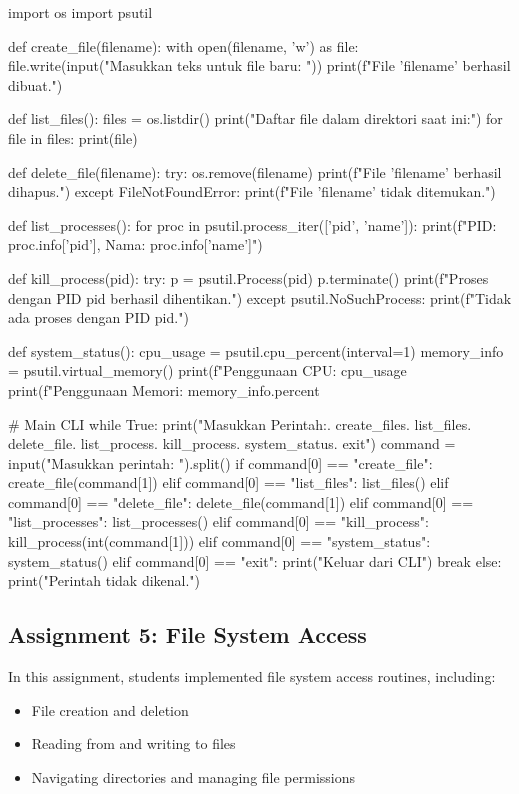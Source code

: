 \documentclass[12pt]{article}
\begin{document}
\begin{python}
import os
import psutil

def create_file(filename):
    with open(filename, 'w') as file:
        file.write(input("Masukkan teks untuk file baru: "))
    print(f"File '{filename}' berhasil dibuat.")

def list_files():
    files = os.listdir()
    print("Daftar file dalam direktori saat ini:")
    for file in files:
        print(file)

def delete_file(filename):
    try:
        os.remove(filename)
        print(f"File '{filename}' berhasil dihapus.")
    except FileNotFoundError:
        print(f"File '{filename}' tidak ditemukan.")

def list_processes():
    for proc in psutil.process_iter(['pid', 'name']):
        print(f"PID: {proc.info['pid']}, Nama: {proc.info['name']}")

def kill_process(pid):
    try:
        p = psutil.Process(pid)
        p.terminate()
        print(f"Proses dengan PID {pid} berhasil dihentikan.")
    except psutil.NoSuchProcess:
        print(f"Tidak ada proses dengan PID {pid}.")

def system_status():
    cpu_usage = psutil.cpu_percent(interval=1)
    memory_info = psutil.virtual_memory()
    print(f"Penggunaan CPU: {cpu_usage}%
    print(f"Penggunaan Memori: {memory_info.percent}%

# Main CLI
while True:
    print("Masukkan Perintah:. create_files. list_files. delete_file. list_process. kill_process. system_status. exit\n")
    command = input("Masukkan perintah: ").split()
    if command[0] == "create_file":
        create_file(command[1])
    elif command[0] == "list_files":
        list_files()
    elif command[0] == "delete_file":
        delete_file(command[1])
    elif command[0] == "list_processes":
        list_processes()
    elif command[0] == "kill_process":
        kill_process(int(command[1]))
    elif command[0] == "system_status":
        system_status()
    elif command[0] == "exit":
        print("Keluar dari CLI")
        break
    else:
        print("Perintah tidak dikenal.")
\end{python}

\subsection{Assignment 5: File System Access}
In this assignment, students implemented file system access routines, including:
\begin{itemize}
    \item File creation and deletion
    \item Reading from and writing to files
    \item Navigating directories and managing file permissions
\end{itemize}
\end{document}
